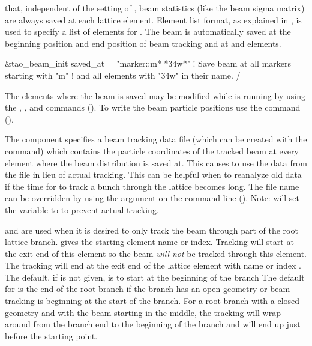 {{{{{{{{{{{\begin{description}
{{{{{{{{that, independent of the setting of , beam statistics (like the beam sigma matrix) are
always saved at each lattice element. Element list format, as explained in ,
is used to specify a list of elements for . The beam is automatically saved at the
beginning position and end position of beam tracking and at  and  elements.
\begin{example}
  &tao_beam_init
    saved_at = "marker::m* *34w*" ! Save beam at all markers starting with "m"
                                  !   and all elements with "34w" in their name. 
  /
\end{example}
The elements where the beam is saved may be modified while \tao is running by using the , , and  commands
(). To write the beam particle positions use the  command
().
%
\item[track_data_file] \Newline
The  component specifies a beam tracking data file (which can be created
with the  command) which contains the particle coordinates of the tracked beam at
every element where the beam distribution is saved at. This causes \tao to use the data from the
file in lieu of actual tracking. This can be helpful when to reanalyze old data if the time for \tao
to track a bunch through the lattice becomes long. The file name can be overridden by using the
 argument on the command line (). Note: \tao will set
the variable  to  to prevent actual tracking.
%
\item[track_start, track_end] \Newline
{} and  are used when it is desired to only track the beam
through part of the root lattice branch.  gives the starting element name or
index. Tracking will start at the exit end of this element so the beam {\em will not} be tracked
through this element. The tracking will end at the exit end of the lattice element with name or
index . The default, if  is not given, is to start at
the beginning of the branch The default for  is the end of the root branch if the 
branch has an open geometry or beam tracking is beginning at the start of the branch. For a root
branch with a closed geometry and with the beam starting in the middle, the tracking will wrap 
around from the branch end to the beginning of the branch and will end up just before the starting point.

}}}}}}}}
\end{description}}}}}}}}}}}}
